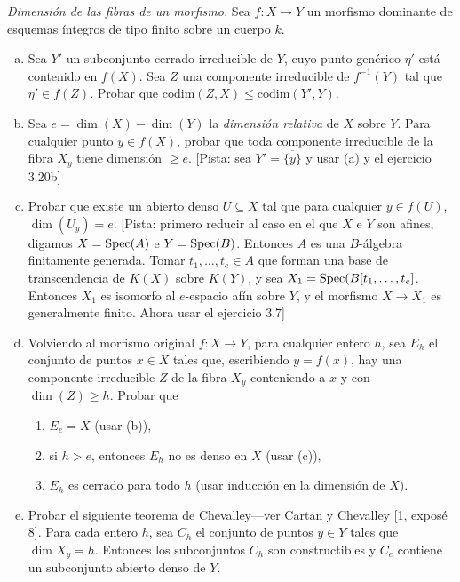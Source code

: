 \documentclass[twoside]{article}
\begin{document}

\begin{ejercicio}{3.22}\emph{Dimensión de las fibras de un morfismo.} Sea $f:X\to Y$ un morfismo dominante de esquemas íntegros de tipo finito sobre un cuerpo $k$. 
\begin{enumerate}[(a)]
\item Sea $Y'$ un subconjunto cerrado irreducible de $Y$, cuyo punto genérico $\eta'$ está contenido en $f(X)$. Sea $Z$ una componente irreducible de $f^{-1}(Y)$ tal que $\eta'\in f(Z)$. Probar que $\mathrm{codim}(Z,X)\leq \mathrm{codim}(Y',Y)$. 
\item Sea $e=\dim(X)-\dim(Y)$ la \emph{dimensión relativa} de $X$ sobre $Y$. Para cualquier punto $y\in f(X)$, probar que toda componente irreducible de la fibra $X_y$ tiene dimensión $\geq e$. [Pista: sea $Y'=\overline{\{y\}}$ y usar (a) y el ejercicio 3.20b]
\item Probar que existe un abierto denso $U\subseteq X$ tal que para cualquier $y\in f(U)$, $\dim(U_y)=e$. [Pista: primero reducir al caso en el que $X$ e $Y$ son afines, digamos $X=\operatorname{Spec}(A)$ e $Y=\operatorname{Spec}(B)$. Entonces $A$ es una $B$-álgebra finitamente generada. Tomar $t_1,\dots, t_e\in A$ que forman una base de transcendencia de $K(X)$ sobre $K(Y)$, y sea $X_1=\operatorname{Spec}(B[t_1,\dots, t_e]$. Entonces $X_1$ es isomorfo al $e$-espacio afín sobre $Y$, y el morfismo $X\to X_1$ es generalmente finito. Ahora usar el ejercicio 3.7]
\item Volviendo al morfismo original $f:X\to Y$, para cualquier entero $h$, sea $E_h$ el conjunto de puntos $x\in X$ tales que, escribiendo $y=f(x)$, hay una componente irreducible $Z$ de la fibra $X_y$ conteniendo a $x$ y con $\dim(Z)\geq h$. Probar que
\begin{enumerate}
\item $E_e=X$ (usar (b)),
\item si $h>e$, entonces $E_h$ no es denso en $X$ (usar (c)),
\item $E_h$ es cerrado para todo $h$ (usar inducción en la dimensión de $X$).
\end{enumerate}
\item Probar el siguiente teorema de Chevalley---ver Cartan y Chevalley [1, exposé 8]. Para cada entero $h$, sea $C_h$ el conjunto de puntos $y\in Y$ tales que $\dim X_y=h$. Entonces los subconjuntos $C_h$ son constructibles y $C_e$ contiene un subconjunto abierto denso de $Y$.
\end{enumerate}

\end{ejercicio}
\end{document}
